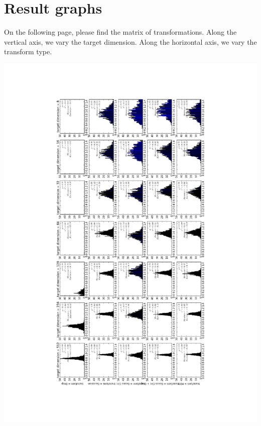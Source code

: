 \documentclass[11pt,a4paper]{article}
\begin{document}
\appendix
\section{Result graphs}
\label{graphs}

On the following page, please find the matrix of transformations. Along the vertical axis, we vary the target dimension. Along the horizontal axis, we vary the transform type.

\vspace*{-8cm}\hspace*{-7cm}
\includegraphics[scale =1.2]{img/annex2.pdf}

	\newpage
	\nocite{*}
	\printbibliography
\end{document}
